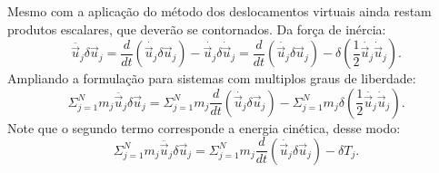 \documentclass[12pt, a4paper]{article}
\begin{document}
\indent Mesmo com a aplicação do método dos deslocamentos virtuais ainda restam produtos escalares, que deverão se contornados. Da força de 
inércia: 
\begin{equation}
    \ddot{\vec{u}_j} \delta \vec{u}_j = \frac{d}{dt} \left( \dot{\vec{u}_j} \delta \vec{u}_j \right) - \dot{\vec{u}_j} \delta 
\dot{\vec{u}}_j = \frac{d}{dt} \left( \dot{\vec{u}_j} \delta \vec{u}_j \right) - \delta \left( \frac{1}{2}\dot{\vec{u}_j} 
\dot{\vec{u}}_j \right). 
\end{equation}
Ampliando a formulação para sistemas com multiplos graus de liberdade:
\begin{equation}
    \Sigma_{j=1}^{N} m_j \ddot{\vec{u}_j} \delta \vec{u}_j = \Sigma_{j=1}^{N} m_j  \frac{d}{dt} \left( \dot{\vec{u}_j} \delta 
    \vec{u}_j \right) - \Sigma_{j=1}^{N} m_j \delta \left( \frac{1}{2}\dot{\vec{u}_j} \dot{\vec{u}}_j \right).
\end{equation}
Note que o segundo
termo corresponde a energia cinética, desse modo: 
\begin{equation}
    \Sigma_{j=1}^{N} m_j \ddot{\vec{u}_j} \delta \vec{u}_j = \Sigma_{j=1}^{N} m_j \frac{d}{dt} \left( \dot{\vec{u}_j} \delta 
    \vec{u}_j \right) - \delta T_j.
\end{equation}
\end{document}
